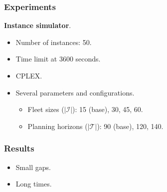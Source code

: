 \begin{frame}
\frametitle{\textbf{Experiments}}

  \textbf{Instance simulator}.
  \pause
  \begin{itemize}
    \item Number of instances: 50.  
    \item Time limit at 3600 seconds.
    \item CPLEX.
    \item Several parameters and configurations.
    \begin{itemize}
      \item Fleet sizes ($|\mathcal{I}|$): 15 (base), 30, 45, 60.
      \item Planning horizons ($|\mathcal{T}|$): 90 (base), 120, 140.
    \end{itemize}
  \end{itemize}
\end{frame}

\begin{frame}
\frametitle{\textbf{Results}}

  \begin{itemize}[<+->]
    \item Small gaps.
    \item Long times.
  \end{itemize}
  
\end{frame}

